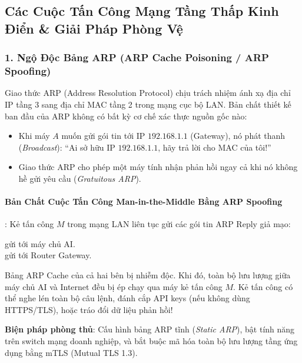 \subsection{Các Cuộc Tấn Công Mạng Tầng Thấp Kinh Điển \& Giải Pháp Phòng Vệ}

\subsubsection{1. Ngộ Độc Bảng ARP (ARP Cache Poisoning / ARP Spoofing)}
Giao thức ARP (Address Resolution Protocol) chịu trách nhiệm ánh xạ địa chỉ IP tầng 3 sang địa chỉ MAC tầng 2 trong mạng cục bộ LAN.
Bản chất thiết kế ban đầu của ARP không có bất kỳ cơ chế xác thực nguồn gốc nào:
\begin{itemize}
  \item Khi máy $A$ muốn gửi gói tin tới IP $192.168.1.1$ (Gateway), nó phát thanh (\textit{Broadcast}): ``Ai sở hữu IP $192.168.1.1$, hãy trả lời cho MAC của tôi!''
  \item Giao thức ARP cho phép một máy tính nhận phản hồi  ngay cả khi nó không hề gửi yêu cầu (\textit{Gratuitous ARP}).
\end{itemize}

\paragraph{Bản Chất Cuộc Tấn Công Man-in-the-Middle Bằng ARP Spoofing}:
Kẻ tấn công $M$ trong mạng LAN liên tục gửi các gói tin ARP Reply giả mạo:
\begin{center}
 gửi tới máy chủ AI.\\
 gửi tới Router Gateway.
\end{center}
Bảng ARP Cache của cả hai bên bị nhiễm độc. Khi đó, toàn bộ lưu lượng giữa máy chủ AI và Internet đều bị ép chạy qua máy kẻ tấn công $M$. Kẻ tấn công có thể nghe lén toàn bộ câu lệnh, đánh cắp API keys (nếu không dùng HTTPS/TLS), hoặc tráo đổi dữ liệu phản hồi!

\textbf{Biện pháp phòng thủ}: Cấu hình bảng ARP tĩnh (\textit{Static ARP}), bật tính năng  trên switch mạng doanh nghiệp, và bắt buộc mã hóa toàn bộ lưu lượng tầng ứng dụng bằng mTLS (Mutual TLS 1.3).

